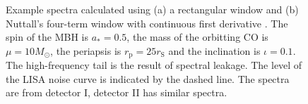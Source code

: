 \documentclass[useAMS,usedcolumn,usegraphicx,usenatbib]{mn2e}
\newcommand{\sub}[1]{\ensuremath{_\mathrm{#1}}}
\begin{document}
\begin{figure}
  \begin{center}
    \quad
    \caption{Example spectra calculated using (a) a rectangular window and (b) Nuttall's four-term window with continuous first derivative \citep{Nuttall1981}. The spin of the MBH is $a_\ast = 0.5$, the mass of the orbitting CO is $\mu = 10 M_\odot$, the periapsis is $r\sub{p} = 25 r\sub{S}$ and the inclination is $\iota = 0.1$. The high-frequency tail is the result of spectral leakage. The level of the LISA noise curve is indicated by the dashed line. The spectra are from detector I, detector II has similar spectra.}
    \label{fig:Windowing}
  \end{center}
\end{figure}
\end{document}

